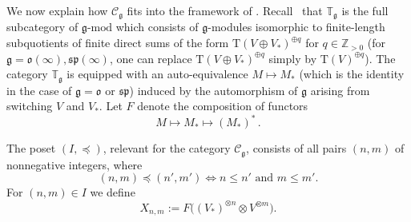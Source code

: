 \documentclass[11pt]{article}
\theoremstyle{plain}
\theoremstyle{nonumberplain}
\theoremstyle{plain}
\theoremstyle{nonumberplain}
\newcommand\bK{\mathbb K}
\newcommand\bT{\mathbb T}
\newcommand\cC{\mathcal C}
\newcommand\fg{\mathfrak{g}}
\newcommand\fsl{\mathfrak{sl}}
\newcommand\fo{\mathfrak{o}}
\newcommand\fsp{\mathfrak{sp}}
\begin{document}
We now explain how $\cC_\fg$ fits into the framework of .
Recall~\cite{DPS} that $\bT_\fg$ is the full subcategory of $\fg\text{-mod}$ which consists of $\fg$-modules isomorphic to finite-length subquotients of finite direct sums of the form $\mathrm{T}\left(V\oplus V_*\right)^{\oplus q}$ for $q\in\mathbb{Z}_{>0}$ (for $\mathfrak{g}=\fo(\infty),\fsp(\infty)$, one can replace $\mathrm{T}\left(V\oplus V_*\right)^{\oplus q}$ simply by $\mathrm{T}(V)^{\oplus q}$).  
The category $\bT_\fg$ is
equipped with an auto-equivalence $M\mapsto M_*$ (which is the identity in the case of $\fg=\fo$ or $\fsp$) induced by the automorphism of $\fg$ arising from switching $V$ and $V_*$. Let $F$ denote
the composition of functors
\begin{equation*}
  M\mapsto {M_*\mapsto} (M_*)^*\,.
\end{equation*}



The poset $(I,{\preceq})$, relevant for the category $\mathcal{C}_\fg$, consists of all pairs $(n,m)$ of nonnegative
integers, where
\begin{equation*}
  (n,m) {\preceq} (n',m')\iff n\le n' \text{ and } m\le m'.
\end{equation*}
{For} $(n,m)\in I$ we define 
\begin{equation*}
  X_{n,m} := F\big((V_*)^{\otimes n}\otimes V^{\otimes m}\big). 
\end{equation*}

%
%
%
\end{document}
